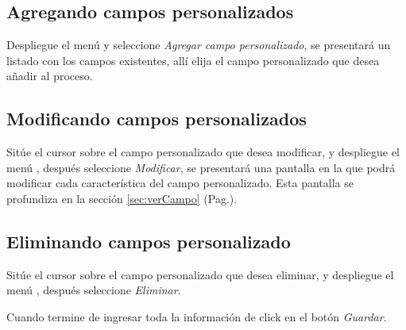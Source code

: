 \subsection{Agregando campos personalizados}
\label{sec:agregarCamposPlantilla}
Despliegue el men\'u \blackberry y seleccione \emph{Agregar campo personalizado}, se
presentar\'a un listado con los campos existentes, all\'i elija el campo
personalizado que desea a\~nadir al proceso.

\subsection{Modificando campos personalizados}
\label{sec:modificarCamposPlantilla}
Sit\'ue el cursor sobre el campo personalizado que desea modificar, y despliegue el
men\'u \blackberry, despu\'es seleccione \emph{Modificar},
se presentar\'a una pantalla en la que podr\'a modificar cada caracter\'istica
del campo personalizado. Esta pantalla se profundiza en la secci\'on
\ref{sec:verCampo} (Pag.\pageref{sec:verCampo}).

\subsection{Eliminando campos personalizado}
\label{sec:eliminarCamposPlantilla}
Sit\'ue el cursor sobre el campo personalizado que desea eliminar, y despliegue el
men\'u \blackberry, despu\'es seleccione \emph{Eliminar}.

Cuando termine de ingresar toda la informaci\'on de click en el bot\'on \emph{Guardar}.